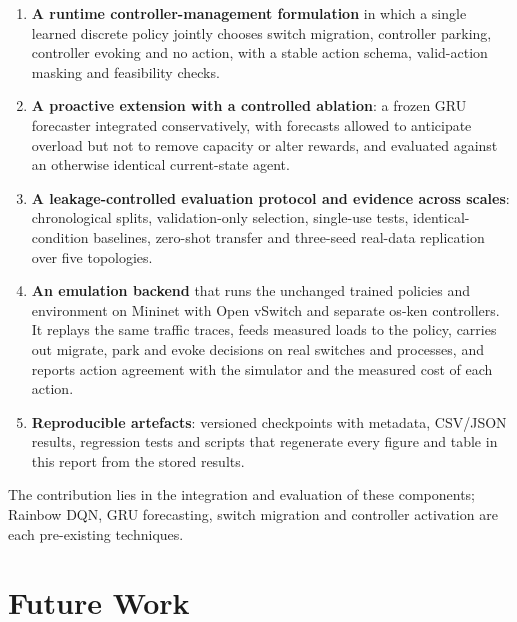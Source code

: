 \begin{enumerate}[leftmargin=*]
  \item \textbf{A runtime controller-management formulation} in which a single learned discrete policy jointly chooses switch migration, controller parking, controller evoking and no action, with a stable action schema, valid-action masking and feasibility checks.
  \item \textbf{A proactive extension with a controlled ablation}: a frozen GRU forecaster integrated conservatively, with forecasts allowed to anticipate overload but not to remove capacity or alter rewards, and evaluated against an otherwise identical current-state agent.
  \item \textbf{A leakage-controlled evaluation protocol and evidence across scales}: chronological splits, validation-only selection, single-use tests, identical-condition baselines, zero-shot transfer and three-seed real-data replication over five topologies.
  \item \textbf{An emulation backend} that runs the unchanged trained policies and environment on Mininet with Open vSwitch and separate os-ken controllers. It replays the same traffic traces, feeds measured loads to the policy, carries out migrate, park and evoke decisions on real switches and processes, and reports action agreement with the simulator and the measured cost of each action.
  \item \textbf{Reproducible artefacts}: versioned checkpoints with metadata, CSV/JSON results, regression tests and scripts that regenerate every figure and table in this report from the stored results.
\end{enumerate}
The contribution lies in the integration and evaluation of these components; Rainbow DQN, GRU forecasting, switch migration and controller activation are each pre-existing techniques.

\section{Future Work}

